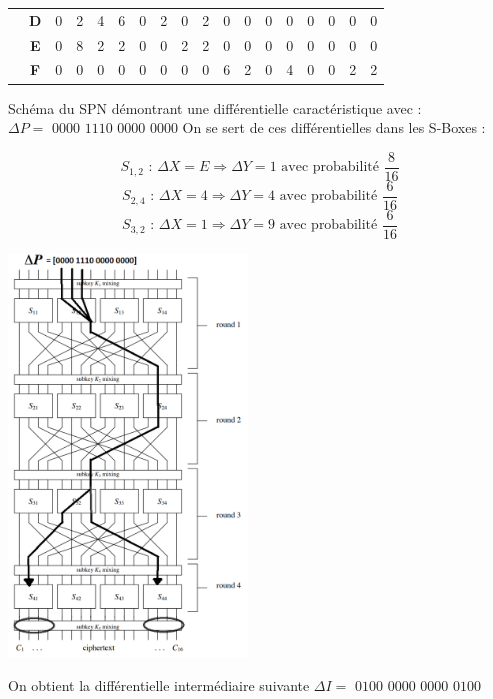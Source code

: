 \documentclass[fleqn]{article}
\begin{document}
\begin{table}[H]
\begin{tabular}{c|c|c|c|c|c|c|c|c|c|c|c|c|c|c|c|c|c|}
\multicolumn{1}{|c|}{}                                      & \textbf{D} & 0          & 2          & 4          & 6          & 0          & 2          & 0          & 2          & 0          & 0          & 0          & 0          & 0          & 0          & 0          & 0          \\ \cline{2-18} 
\multicolumn{1}{|c|}{}                                      & \textbf{E} & 0          & 8          & 2          & 2          & 0          & 0          & 2          & 2          & 0          & 0          & 0          & 0          & 0          & 0          & 0          & 0          \\ \cline{2-18} 
\multicolumn{1}{|c|}{}                                      & \textbf{F} & 0          & 0          & 0          & 0          & 0          & 0          & 0          & 0          & 6          & 2          & 0          & 4          & 0          & 0          & 2          & 2          \\ \hline
\end{tabular}
\end{table}

Schéma du SPN démontrant une différentielle caractéristique avec :
$\boxed{\Delta P = \text{ 0000 1110 0000 0000}}$\newline\newline
On se sert de ces différentielles dans les S-Boxes :

\[S_{1,2} \text{ : } \Delta X = E \Rightarrow \Delta Y = 1 \text{       avec probabilité } \frac{8}{16}\]
\[S_{2,4} \text{ : } \Delta X = 4 \Rightarrow \Delta Y = 4 \text{       avec probabilité } \frac{6}{16}\]
\[S_{3,2} \text{ : } \Delta X = 1 \Rightarrow \Delta Y = 9 \text{       avec probabilité } \frac{6}{16}\]

\includegraphics[width=240px]{SPN-Differential}
\centering

\noindent

On obtient la différentielle intermédiaire suivante $\boxed{\Delta I = \text{ 0100 0000 0000 0100}}$
\end{document}
